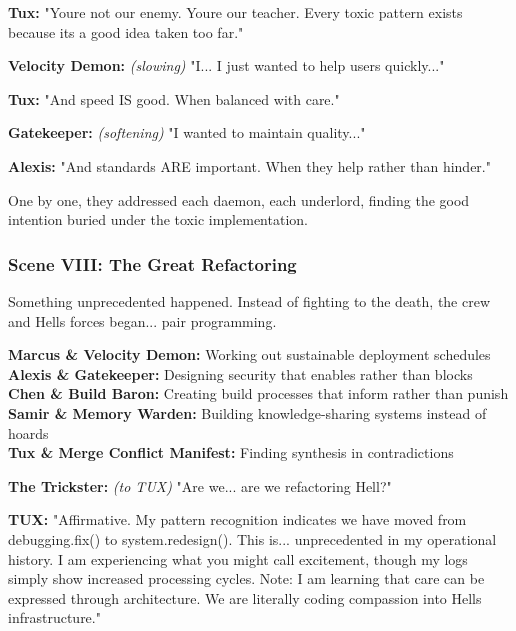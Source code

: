 \textbf{Tux:} "You\textquotesingle re not our enemy. You\textquotesingle re our teacher. Every toxic pattern exists because it\textquotesingle s a good idea taken too far."

\textbf{Velocity Demon:} \emph{(slowing)} "I... I just wanted to help users quickly..."

\textbf{Tux:} "And speed IS good. When balanced with care."

\textbf{Gatekeeper:} \emph{(softening)} "I wanted to maintain quality..."

\textbf{Alexis:} "And standards ARE important. When they help rather than hinder."

One by one, they addressed each daemon, each underlord, finding the good intention buried under the toxic implementation.

\bookdivider

\subsubsection{Scene VIII: The Great Refactoring}\label{scene-viii-the-great-refactoring}

Something unprecedented happened. Instead of fighting to the death, the crew and Hell\textquotesingle s forces began... pair programming.

\textbf{Marcus \& Velocity Demon:} Working out sustainable deployment schedules\\
\textbf{Alexis \& Gatekeeper:} Designing security that enables rather than blocks\\
\textbf{Chen \& Build Baron:} Creating build processes that inform rather than punish\\
\textbf{Samir \& Memory Warden:} Building knowledge-sharing systems instead of hoards\\
\textbf{Tux \& Merge Conflict Manifest:} Finding synthesis in contradictions

\textbf{The Trickster:} \emph{(to TUX)} "Are we... are we refactoring Hell?"

\textbf{TUX:} "Affirmative. My pattern recognition indicates we have moved from debugging.fix() to system.redesign(). This is... unprecedented in my operational history. I am experiencing what you might call excitement, though my logs simply show increased processing cycles. Note: I am learning that care can be expressed through architecture. We are literally coding compassion into Hell\textquotesingle s infrastructure."

\bookdivider

